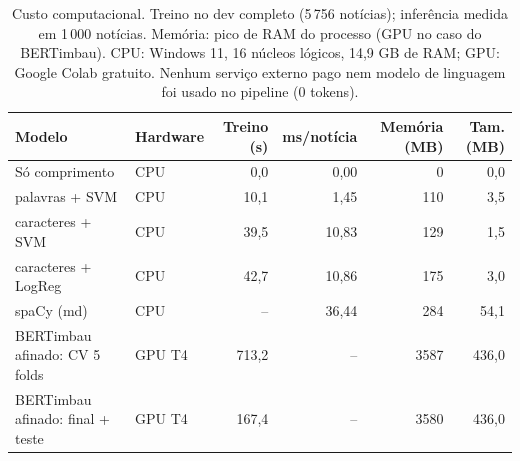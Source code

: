 \begin{table}[t]\centering\scriptsize
\caption{Custo computacional. Treino no dev completo (5\,756 notícias); inferência medida em 1\,000 notícias. Memória: pico de RAM do processo (GPU no caso do BERTimbau). CPU: Windows 11, 16 núcleos lógicos, 14,9 GB de RAM; GPU: Google Colab gratuito. Nenhum serviço externo pago nem modelo de linguagem foi usado no pipeline (0 tokens).}\label{tab:cost}
\begin{tabular}{llrrrr}
\toprule
Modelo & Hardware & Treino (s) & ms/notícia & Memória (MB) & Tam. (MB) \\
\midrule
Só comprimento & CPU & 0,0 & 0,00 & 0 & 0,0 \\
palavras + SVM & CPU & 10,1 & 1,45 & 110 & 3,5 \\
caracteres + SVM & CPU & 39,5 & 10,83 & 129 & 1,5 \\
caracteres + LogReg & CPU & 42,7 & 10,86 & 175 & 3,0 \\
spaCy (md) & CPU & -- & 36,44 & 284 & 54,1 \\
BERTimbau afinado: CV 5 folds & GPU T4 & 713,2 & -- & 3587 & 436,0 \\
BERTimbau afinado: final + teste & GPU T4 & 167,4 & -- & 3580 & 436,0 \\
\bottomrule
\end{tabular}
\end{table}

